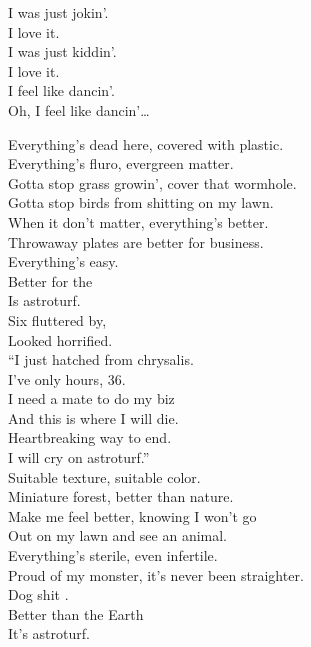 I was just jokin'. \\
I love it. \\
I was just kiddin'. \\
I love it. \\

I feel like dancin'. \\
Oh, I feel like dancin'… \\





Everything's dead here, covered with plastic. \\
Everything's fluro, evergreen matter. \\
Gotta stop grass growin', cover that wormhole. \\
Gotta stop birds from shitting on my lawn. \\

When it don't matter, everything's better. \\
Throwaway plates are better for business. \\
Everything's easy. \\
Better for the  \\
Is astroturf. \\

Six  fluttered by, \\
Looked horrified. \\
``I just hatched from chrysalis. \\
I've only hours, 36. \\
I need a mate to do my biz \\
And this is where I will die. \\
Heartbreaking way to end. \\
I will cry on astroturf.'' \\

Suitable texture, suitable color. \\
Miniature forest, better than nature. \\
Make me feel better, knowing I won't go \\
Out on my lawn and see an animal. \\

Everything's sterile, even infertile. \\
Proud of my monster, it's never been straighter. \\
Dog shit . \\
Better than the Earth \\
It's astroturf. \\

